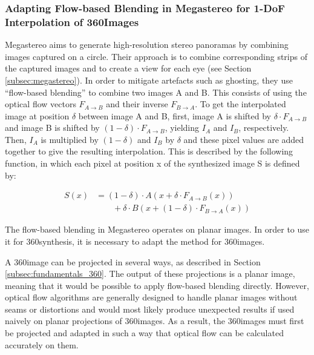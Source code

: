 
\subsubsection{Adapting Flow-based Blending in Megastereo for 1-DoF Interpolation of 360\degree Images}
Megastereo \cite{megastereo} aims to generate high-resolution stereo panoramas by combining images captured on a circle. Their approach is to combine corresponding strips of the captured images and to create a view for each eye (see Section \ref{subsec:megastereo}). In order to mitigate artefacts such as ghosting, they use ``flow-based blending'' to combine two images A and B. This consists of using the optical flow vectors $F_{A\rightarrow B}$ and their inverse $F_{B\rightarrow A}$. To get the interpolated image at position $\delta$ between image A and B, first, image A is shifted by $\delta \cdot F_{A\to B}$ and image B is shifted by $(1 - \delta) \cdot F_{A\to B}$, yielding $I_A$ and $I_B$, respectively. Then, $I_A$ is multiplied by $(1-\delta)$ and $I_B$ by $\delta$ and these pixel values are added together to give the resulting interpolation. This is described by the following function, in which each pixel at position x of the synthesized image S is defined by: 

\begin{align}
S(x) &= (1-\delta ) \cdot A( x + \delta \cdot F_{A\to B}(x)) \nonumber\\
     &\qquad {} + \delta \cdot B( x + (1-\delta) \cdot F_{B\to A}(x)) \label{eq:flow_blending}
   \end{align}

The flow-based blending in Megastereo operates on planar images. In order to use it for 360\degree synthesis, it is necessary to adapt the method for 360\degree images.

A 360\degree image can be projected in several ways, as described in Section \ref{subsec:fundamentals_360}. The output of these projections is a planar image, meaning that it would be possible to apply flow-based blending directly. However, optical flow algorithms are generally designed to handle planar images without seams or distortions and would most likely produce unexpected results if used naively on planar projections of 360\degree images. As a result, the 360\degree images must first be projected and adapted in such a way that optical flow can be calculated accurately on them.

